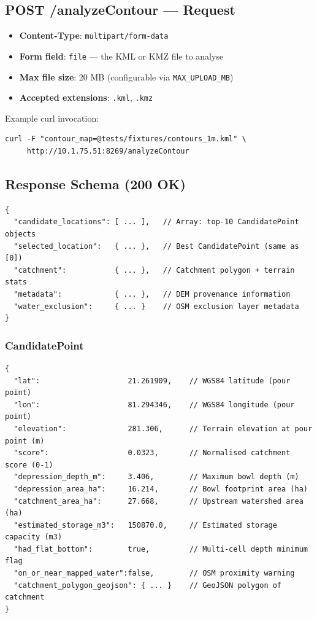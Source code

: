 \documentclass[12pt,a4paper]{article}
\begin{document}
\subsection{POST /analyzeContour --- Request}

\begin{itemize}
    \item \textbf{Content-Type}: \texttt{multipart/form-data}
    \item \textbf{Form field}: \texttt{file} --- the KML or KMZ file to analyse
    \item \textbf{Max file size}: 20 MB (configurable via \texttt{MAX\_UPLOAD\_MB})
    \item \textbf{Accepted extensions}: \texttt{.kml}, \texttt{.kmz}
\end{itemize}

Example curl invocation:
\begin{lstlisting}[style=bash]
curl -F "contour_map=@tests/fixtures/contours_1m.kml" \
     http://10.1.75.51:8269/analyzeContour
\end{lstlisting}

\subsection{Response Schema (200 OK)}

\begin{lstlisting}[style=json]
{
  "candidate_locations": [ ... ],   // Array: top-10 CandidatePoint objects
  "selected_location":   { ... },   // Best CandidatePoint (same as [0])
  "catchment":           { ... },   // Catchment polygon + terrain stats
  "metadata":            { ... },   // DEM provenance information
  "water_exclusion":     { ... }    // OSM exclusion layer metadata
}
\end{lstlisting}

\subsubsection{CandidatePoint}
\begin{lstlisting}[style=json]
{
  "lat":                    21.261909,    // WGS84 latitude (pour point)
  "lon":                    81.294346,    // WGS84 longitude (pour point)
  "elevation":              281.306,      // Terrain elevation at pour point (m)
  "score":                  0.0323,       // Normalised catchment score (0-1)
  "depression_depth_m":     3.406,        // Maximum bowl depth (m)
  "depression_area_ha":     16.214,       // Bowl footprint area (ha)
  "catchment_area_ha":      27.668,       // Upstream watershed area (ha)
  "estimated_storage_m3":   150870.0,     // Estimated storage capacity (m3)
  "had_flat_bottom":        true,         // Multi-cell depth minimum flag
  "on_or_near_mapped_water":false,        // OSM proximity warning
  "catchment_polygon_geojson": { ... }    // GeoJSON polygon of catchment
}
\end{lstlisting}
\end{document}
